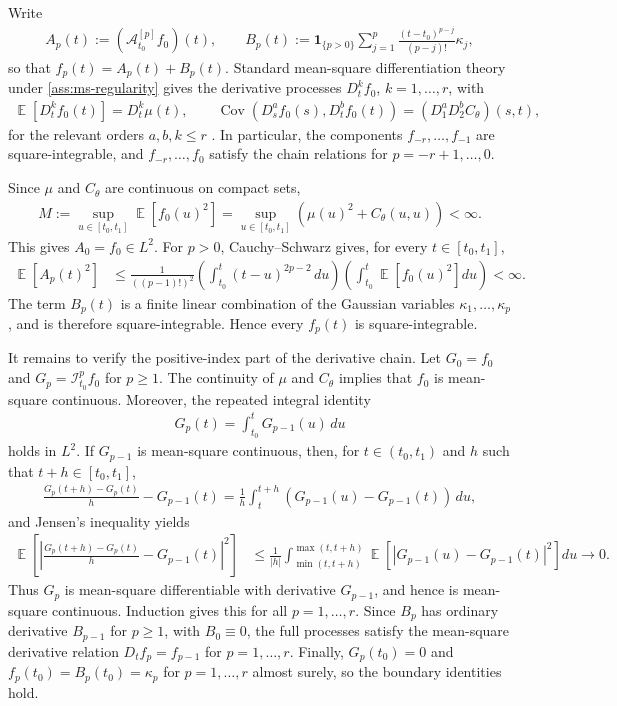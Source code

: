 \documentclass[11pt,a4paper]{article}
\theoremstyle{definition}
\theoremstyle{remark}
\DeclareMathOperator{\E}{\mathbb{E}}
\DeclareMathOperator{\Cov}{Cov}
\begin{document}
\begin{mainproof}
Write
\begin{align*}
A_p(t) := (\mathcal A_{t_0}^{[p]}f_0)(t),
\qquad
B_p(t) := \mathbf{1}_{\{p>0\}}\sum_{j=1}^{p}\frac{(t-t_0)^{p-j}}{(p-j)!}\kappa_j,
\end{align*}
so that \(f_p(t)=A_p(t)+B_p(t)\). Standard mean-square differentiation theory under \cref{ass:ms-regularity} gives the derivative processes \(D_t^k f_0\), \(k=1,\ldots,r\), with
\begin{align*}
\E[D_t^k f_0(t)] = D_t^k\mu(t),
\qquad
\Cov(D_s^a f_0(s),D_t^b f_0(t))=(D_1^aD_2^b C_\theta)(s,t),
\end{align*}
for the relevant orders \(a,b,k\le r\) \citep[Theorem~2.5.1]{cramer1967stationary}. In particular, the components \(f_{-r},\ldots,f_{-1}\) are square-integrable, and \(f_{-r},\ldots,f_0\) satisfy the chain relations for \(p=-r+1,\ldots,0\).

Since \(\mu\) and \(C_\theta\) are continuous on compact sets,
\begin{align*}
M:=\sup_{u\in[t_0,t_1]}\E[f_0(u)^2]
=\sup_{u\in[t_0,t_1]}\left(\mu(u)^2+C_\theta(u,u)\right)<\infty.
\end{align*}
This gives \(A_0=f_0\in L^2\). For \(p>0\), Cauchy--Schwarz gives, for every \(t\in[t_0,t_1]\),
\begin{align*}
\E[A_p(t)^2]
&\le
\frac{1}{((p-1)!)^2}
\left(\int_{t_0}^t (t-u)^{2p-2}\,du\right)
\left(\int_{t_0}^t \E[f_0(u)^2]du\right)<\infty.
\end{align*}
The term \(B_p(t)\) is a finite linear combination of the Gaussian variables \(\kappa_1,\ldots,\kappa_p\), and is therefore square-integrable. Hence every \(f_p(t)\) is square-integrable.

It remains to verify the positive-index part of the derivative chain. Let \(G_0=f_0\) and \(G_p=\mathcal I_{t_0}^p f_0\) for \(p\ge1\). The continuity of \(\mu\) and \(C_\theta\) implies that \(f_0\) is mean-square continuous. Moreover, the repeated integral identity
\begin{align*}
G_p(t)=\int_{t_0}^t G_{p-1}(u)\,du
\end{align*}
holds in \(L^2\). If \(G_{p-1}\) is mean-square continuous, then, for \(t\in(t_0,t_1)\) and \(h\) such that \(t+h\in[t_0,t_1]\),
\begin{align*}
\frac{G_p(t+h)-G_p(t)}{h}-G_{p-1}(t)
=\frac{1}{h}\int_t^{t+h}\left(G_{p-1}(u)-G_{p-1}(t)\right)\,du,
\end{align*}
and Jensen's inequality yields
\begin{align*}
\E\!\left[\left|\frac{G_p(t+h)-G_p(t)}{h}-G_{p-1}(t)\right|^2\right]
&\le
\frac{1}{|h|}\int_{\min(t,t+h)}^{\max(t,t+h)}
\E\!\left[|G_{p-1}(u)-G_{p-1}(t)|^2\right]du
\to0.
\end{align*}
Thus \(G_p\) is mean-square differentiable with derivative \(G_{p-1}\), and hence is mean-square continuous. Induction gives this for all \(p=1,\ldots,r\). Since \(B_p\) has ordinary derivative \(B_{p-1}\) for \(p\ge1\), with \(B_0\equiv0\), the full processes satisfy the mean-square derivative relation \(D_t f_p=f_{p-1}\) for \(p=1,\ldots,r\). Finally, \(G_p(t_0)=0\) and $f_p(t_0)=B_p(t_0)=\kappa_p$ for $p=1,\ldots,r$ almost surely, so the boundary identities hold.


\end{mainproof}
\end{document}
